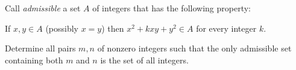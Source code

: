 Call \emph{admissible} a set $A$ of integers that has the following property:

If $x, y \in A$ (possibly $x = y$) then $x^{2} + kxy + y^{2} \in A$ for every integer $k$.

Determine all pairs $m, n$ of nonzero integers such that the only admissible set containing both $m$ and $n$ is the set of all integers.
